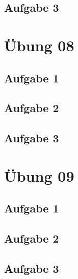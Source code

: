 \documentclass[a4paper]{article}
\begin{document}
\subsection{Aufgabe 3}




\newpage
\section{Übung 08}
\subsection{Aufgabe 1}

\subsection{Aufgabe 2}


\subsection{Aufgabe 3}




\newpage
\section{Übung 09}
\subsection{Aufgabe 1}

\subsection{Aufgabe 2}


\subsection{Aufgabe 3}
\end{document}

